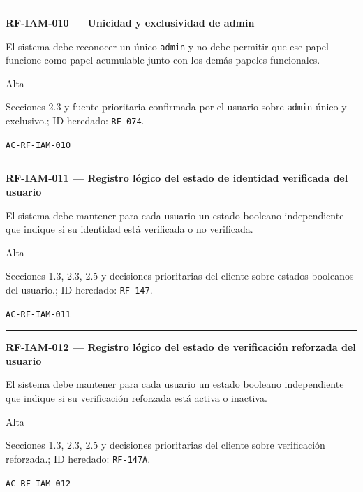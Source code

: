 \documentclass[10pt,letterpaper]{article}
\begin{document}
\vspace{0.25em}\hrule\vspace{0.65em}
\noindent\textbf{RF-IAM-010 --- Unicidad y exclusividad de admin}\par
\begin{description}[style=nextline,leftmargin=3.15cm,labelwidth=2.8cm,font=\normalfont\bfseries]
\item[Obligación] El sistema debe reconocer un único \texttt{admin} y no debe permitir que ese papel funcione como papel acumulable junto con los demás papeles funcionales.
\item[Prioridad] Alta
\item[Procedencia] Secciones 2.3 y fuente prioritaria confirmada por el usuario sobre \texttt{admin} único y exclusivo.; ID heredado: \texttt{RF-074}.
\item[Verificación] \texttt{AC-RF-IAM-010}
\end{description}
\vspace{0.25em}\hrule\vspace{0.65em}
\noindent\textbf{RF-IAM-011 --- Registro lógico del estado de identidad verificada del usuario}\par
\begin{description}[style=nextline,leftmargin=3.15cm,labelwidth=2.8cm,font=\normalfont\bfseries]
\item[Obligación] El sistema debe mantener para cada usuario un estado booleano independiente que indique si su identidad está verificada o no verificada.
\item[Prioridad] Alta
\item[Procedencia] Secciones 1.3, 2.3, 2.5 y decisiones prioritarias del cliente sobre estados booleanos del usuario.; ID heredado: \texttt{RF-147}.
\item[Verificación] \texttt{AC-RF-IAM-011}
\end{description}
\vspace{0.25em}\hrule\vspace{0.65em}
\noindent\textbf{RF-IAM-012 --- Registro lógico del estado de verificación reforzada del usuario}\par
\begin{description}[style=nextline,leftmargin=3.15cm,labelwidth=2.8cm,font=\normalfont\bfseries]
\item[Obligación] El sistema debe mantener para cada usuario un estado booleano independiente que indique si su verificación reforzada está activa o inactiva.
\item[Prioridad] Alta
\item[Procedencia] Secciones 1.3, 2.3, 2.5 y decisiones prioritarias del cliente sobre verificación reforzada.; ID heredado: \texttt{RF-147A}.
\item[Verificación] \texttt{AC-RF-IAM-012}
\end{description}
\end{document}
